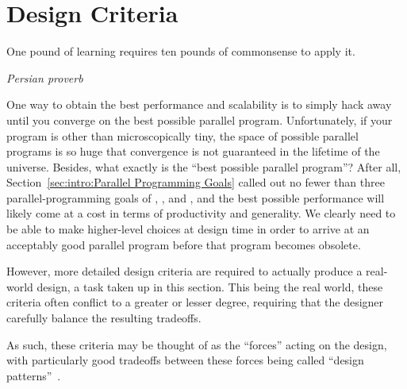 
\section{Design Criteria}
\label{sec:SMPdesign:Design Criteria}
%
\epigraph{One pound of learning requires ten pounds of commonsense to apply it.}
	 {\emph{Persian proverb}}

One way to obtain the best performance and scalability is to simply
hack away until you converge on the best possible parallel program.
Unfortunately, if your program is other than microscopically tiny,
the space of possible parallel programs is so huge
that convergence is not guaranteed in the lifetime of the universe.
Besides, what exactly is the ``best possible parallel program''?
After all, Section~\ref{sec:intro:Parallel Programming Goals}
called out no fewer than three parallel-programming goals of
, , and ,
and the best possible performance will likely come at a cost in
terms of productivity and generality.
We clearly need to be able to make higher-level choices at design
time in order to arrive at an acceptably good parallel program
before that program becomes obsolete.

However, more detailed design criteria are required to
actually produce a real-world design, a task taken up in this section.
This being the real world, these criteria often conflict to a
greater or lesser degree, requiring that the designer carefully
balance the resulting tradeoffs.

As such, these criteria may be thought of as the ``forces''
acting on the design, with particularly good tradeoffs between
these forces being called ``design patterns''~\cite{Alexander79,GOF95}.

